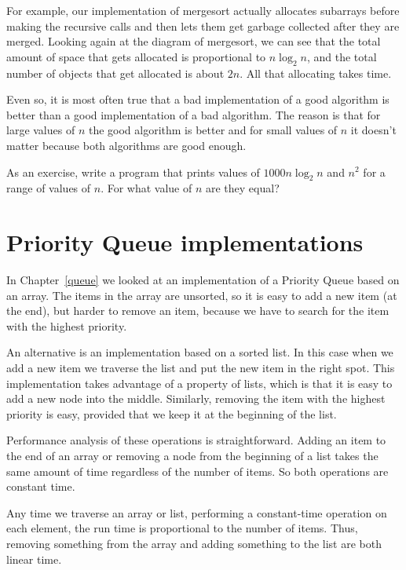 \documentclass[12pt]{book}
\theoremstyle{exercise}
\begin{document}
For example, our implementation of mergesort actually allocates
subarrays before making the recursive calls and then lets them get
garbage collected after they are merged.  Looking again at the diagram
of mergesort, we can see that the total amount of space that gets
allocated is proportional to $n \log_2 n$, and the total number of
objects that get allocated is about $2n$.  All that allocating takes
time.

Even so, it is most often true that a bad implementation of a good
algorithm is better than a good implementation of a bad algorithm.
The reason is that for large values of $n$ the good algorithm is
better and for small values of $n$ it doesn't matter because both
algorithms are good enough.

As an exercise, write a program that prints values of $1000 n \log_2
n$ and $n^2$ for a range of values of $n$.  For what value of $n$ are
they equal?


\section{Priority Queue implementations}

In Chapter~\ref{queue} we looked at an implementation of a Priority
Queue based on an array.  The items in the array are unsorted, so it
is easy to add a new item (at the end), but harder to remove an
item, because we have to search for the item with the highest
priority.

An alternative is an implementation based on a sorted list.
In this case when we add a new item we traverse the list and
put the new item in the right spot.  This implementation takes
advantage of a property of lists, which is that it is easy to
add a new node into the middle.  Similarly, removing the
item with the highest priority is easy, provided that we
keep it at the beginning of the list.

Performance analysis of these operations is straightforward.
Adding an item to the end of an array or
removing a node from the beginning of a list takes the same amount
of time regardless of the number of items.  So both operations
are constant time.


Any time we traverse an array or list, performing a constant-time
operation on each element, the run time is
proportional to the number of items.  Thus, removing something
from the array and adding something to the list are both
linear time.
\end{document}
